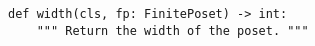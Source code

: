 \begin{verbatim}
def width(cls, fp: FinitePoset) -> int:
    """ Return the width of the poset. """
\end{verbatim}